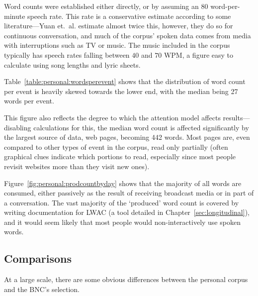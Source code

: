 Word counts were established either directly, or by assuming an 80 word-per-minute speech rate.  This rate is a conservative estimate according to some literature---Yuan et.\ al.\cite{yuan2006towards} estimate almost twice this, however, they do so for continuous conversation, and much of the corpus' spoken data comes from media with interruptions such as TV or music.  The music included in the corpus typically has speech rates falling between $40$ and $70$ WPM, a figure easy to calculate using song lengths and lyric sheets.

Table~\ref{table:personal:wordsperevent} shows that the distribution of word count per event is heavily skewed towards the lower end, with the median being 27 words per event.

This figure also reflects the degree to which the attention model affects results---disabling calculations for this, the median word count is affected significantly by the largest source of data, web pages, becoming 442 words.  Most pages are, even compared to other types of event in the corpus, read only partially (often graphical clues indicate which portions to read, especially since most people revisit websites more than they visit new ones).

Figure~\ref{fig:personal:prodcountbyday} shows that the majority of all words are consumed, either passively as the result of receiving broadcast media or in part of a conversation.  The vast majority of the `produced' word count is covered by writing documentation for LWAC (a tool detailed in Chapter~\ref{sec:longitudinal}), and it would seem likely that most people would non-interactively use spoken words.




\FloatBarrier{}




\subsection{Comparisons}



At a large scale, there are some obvious differences between the personal corpus and the BNC's selection.

